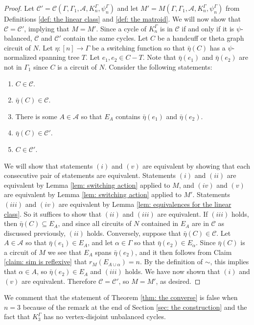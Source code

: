 \documentclass[12pt]{article}
\theoremstyle{definition}
\newcommand{\cA}{\mathcal{A}}
\newcommand{\cC}{\mathcal{C}}
\begin{document}
\begin{proof}
Let $\cC' = \cC(\Gamma, \Gamma_1, \cA, K_n^{\Gamma}, \psi_n^{\Gamma})$ and let $M' = M(\Gamma, \Gamma_1, \cA, K_n^{\Gamma}, \psi_n^{\Gamma})$ from Definitions \ref{def: the linear class} and \ref{def: the matroid}.
We will now show that $\cC = \cC'$, implying that $M = M'$.
Since a cycle of $K_n^{\Gamma}$ is in $\cC$ if and only if it is $\psi$-balanced, $\cC$ and $\cC'$ contain the same cycles.
Let $C$ be a handcuff or theta graph circuit of $N$.
Let $\eta \colon [n] \to \Gamma$ be a switching function so that $\bar{\eta}(C)$ has a $\psi$-normalized spanning tree $T$.
Let $e_1, e_2 \in C - T$.
Note that $\bar{\eta}(e_1)$ and $\bar {\eta}(e_2)$ are not in $\Gamma_1$ since $C$ is a circuit of $N$.
Consider the following statements:
\begin{enumerate}[label=$(\roman*)$]
    \item $C \in \cC$.
    \item $\bar{\eta}(C) \in \cC$.
    \item There is some $A \in \cA$ so that $E_A$ contains $\bar{\eta}(e_1)$ and $\bar {\eta}(e_2)$.
    \item $\bar{\eta}(C) \in \cC'$.
    \item $C \in \cC'$.
\end{enumerate}
We will show that statements $(i)$ and $(v)$ are equivalent by showing that each consecutive pair of statements are equivalent.
Statements $(i)$ and $(ii)$ are equivalent by Lemma \ref{lem: switching action} applied to $M$, and $(iv)$ and $(v)$ are equivalent by Lemma \ref{lem: switching action} applied to $M'$.
Statements $(iii)$ and $(iv)$ are equivalent by Lemma \ref{lem: equivalences for the linear class}.
So it suffices to show that $(ii)$ and $(iii)$ are equivalent.
If $(iii)$ holds, then $\bar{\eta}(C) \subseteq E_A$, and since all circuits of $N$ contained in $E_A$ are in $\cC$ as discussed previously, $(ii)$ holds.
Conversely, suppose that $\bar{\eta}(C) \in \cC$.
Let $A \in \cA$ so that $\bar{\eta}(e_1) \in E_A$, and let $\alpha \in \Gamma$ so that $\bar{\eta}(e_2) \in E_{\alpha}$.
Since $\bar{\eta}(C)$ is a circuit of $M$ we see that $E_{A}$ spans $\bar{\eta}(e_2)$, and it then follows from Claim \ref{claim: sim is reflexive} that $r_M(E_{A \cup \alpha}) = n$. 
By the definition of $\sim$, this implies that $\alpha \in A$, so $\bar{\eta}(e_2) \in E_A$ and $(iii)$ holds.
We have now shown that $(i)$ and $(v)$ are equivalent.
Therefore $\cC = \cC'$, so $M = M'$, as desired.
\end{proof}


We comment that the statement of Theorem \ref{thm: the converse} is false when $n = 3$ because of the remark at the end of Section \ref{sec: the construction} and the fact that $K_3^{\Gamma}$ has no vertex-disjoint unbalanced cycles.
\end{document}
